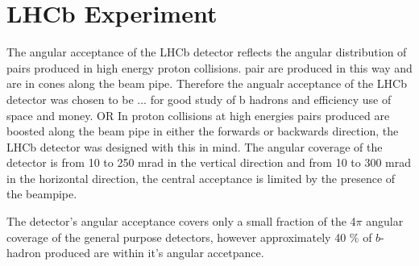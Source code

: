 \section{LHCb Experiment}







The angular acceptance of the LHCb detector reflects the angular distribution of \bbbar pairs produced in high energy proton collisions. \bbbar pair are produced in this way and are in cones along the beam pipe. Therefore the angualr acceptance of the LHCb detector was chosen to be ... for good study of b hadrons and efficiency use of space and money.
OR
In proton collisions at high energies \bbbar pairs produced are boosted along the beam pipe in either the forwards or backwards direction, the LHCb detector was designed with this in mind. The angular coverage of the detector is from 10 to 250 mrad in the vertical direction and from 10 to 300 mrad in the horizontal direction, the central acceptance is limited by the presence of the beampipe. 


The detector's angular acceptance covers only a small fraction of the 4$\pi$ angular coverage of the general purpose detectors, however approximately 40 $\%$ of $b$-hadron produced are within it's angular accetpance. 





